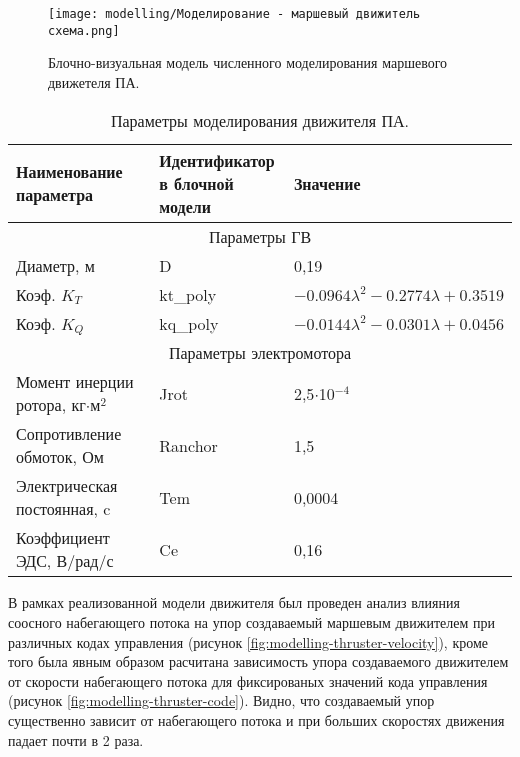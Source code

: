 \begin{figure}[ht]
    \centering
    \texttt{[image: modelling/Моделирование - маршевый движитель схема.png]}
    \caption{Блочно-визуальная модель численного моделирования маршевого движетеля ПА.}
    \label{fig:modelling-thruster}
\end{figure}

\begin{table}
    \caption{Параметры моделирования движителя ПА.}
    \label{tab:modelling-thruster}
    \centering
    \begin{tabular}{lll}
        \toprule
        \makecell{Наименование \\ параметра} & \makecell{Идентификатор \\ в блочной модели} & Значение \\
        \midrule
        \multicolumn{3}{c}{Параметры ГВ} \\
        \midrule
        Диаметр, м  & D & 0,19\\
        Коэф. $K_T$ & kt\_poly & $-0.0964\lambda^2 -0.2774\lambda + 0.3519$\\
        Коэф. $K_Q$ & kq\_poly & $-0.0144\lambda^2 -0.0301\lambda + 0.0456$\\
        \midrule
        \multicolumn{3}{c}{Параметры электромотора} \\
        \midrule
        Момент инерции ротора, кг$\cdot$м$^2$ & Jrot & 2,5$\cdot$10$^{-4}$ \\
        Сопротивление обмоток, Ом & Ranchor & 1,5 \\
        Электрическая постоянная, c & Tem & 0,0004 \\
        Коэффициент ЭДС, В/рад/с & Ce & 0,16 \\
        \bottomrule
    \end{tabular}
\end{table}

В рамках реализованной модели движителя был проведен анализ влияния соосного набегающего потока на упор создаваемый маршевым движителем при различных кодах управления (рисунок \ref{fig:modelling-thruster-velocity}), кроме того была явным образом расчитана зависимость упора создаваемого движителем от скорости набегающего потока для фиксированых значений кода управления (рисунок \ref{fig:modelling-thruster-code}).
Видно, что создаваемый упор существенно зависит от набегающего потока и при больших скоростях движения падает почти в 2 раза.

